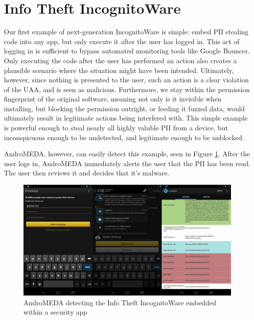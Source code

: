\section{Info Theft IncognitoWare}
Our first example of next-generation IncognitoWare is simple: embed PII stealing code into any app, but only execute it after the user has logged in. This act of logging in is sufficient to bypass automated monitoring tools like Google Bouncer. Only executing the code after the user has performed an action also creates a plausible scenario where the situation might have been intended. Ultimately, however, since nothing is presented to the user, such an action is a clear violation of the UAA, and is seen as malicious. Furthermore, we stay within the permission fingerprint of the original software, meaning not only is it invisible when installing, but blocking the permission outright, or feeding it fuzzed data, would ultimately result in legitimate actions being interfered with. This simple example is powerful enough to steal nearly all highly valuble PII from a device, but inconspicuous enough to be undetected, and legitimate enough to be unblocked.

AndroMEDA, however, can easily detect this example, seen in Figure \ref{fig:infotheft_visual}. After the user logs in, AndroMEDA immediately alerts the user that the PII has been read. The user then reviews it and decides that it's malware.

\begin{figure}[h]
\begin{center}
\includegraphics[width=1.0\columnwidth]{figs/lookout_detection}
\caption{AndroMEDA detecting the Info Theft IncognitoWare embedded within a security app }
\label{fig:infotheft_visual}
\end{center}
\end{figure}

